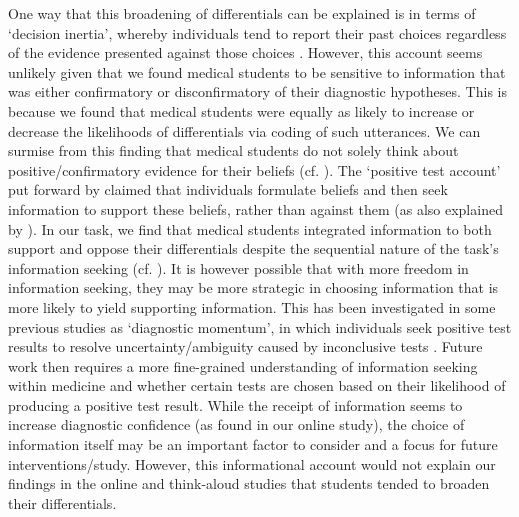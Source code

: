 \documentclass[a4paper, nobind]{templates/ociamthesis}
\begin{document}
One way that this broadening of differentials can be explained is in terms of `decision inertia', whereby individuals tend to report their past choices regardless of the evidence presented against those choices \autocite{akaishi_autonomous_2014}. However, this account seems unlikely given that we found medical students to be sensitive to information that was either confirmatory or disconfirmatory of their diagnostic hypotheses. This is because we found that medical students were equally as likely to increase or decrease the likelihoods of differentials via coding of such utterances. We can surmise from this finding that medical students do not solely think about positive/confirmatory evidence for their beliefs (cf. \textcite{kaanders_humans_2022}). The `positive test account' put forward by \autocite{klayman_confirmation_1987} claimed that individuals formulate beliefs and then seek information to support these beliefs, rather than against them (as also explained by \textcite{hunt_approach-induced_2016}). In our task, we find that medical students integrated information to both support and oppose their differentials despite the sequential nature of the task's information seeking (cf. \textcite{jonas_confirmation_2001}). It is however possible that with more freedom in information seeking, they may be more strategic in choosing information that is more likely to yield supporting information. This has been investigated in some previous studies as `diagnostic momentum', in which individuals seek positive test results to resolve uncertainty/ambiguity caused by inconclusive tests \autocite{aron_diagnostic_2024}. Future work then requires a more fine-grained understanding of information seeking within medicine and whether certain tests are chosen based on their likelihood of producing a positive test result. While the receipt of information seems to increase diagnostic confidence (as found in our online study), the choice of information itself may be an important factor to consider and a focus for future interventions/study. However, this informational account would not explain our findings in the online and think-aloud studies that students tended to broaden their differentials.\\
\end{document}
